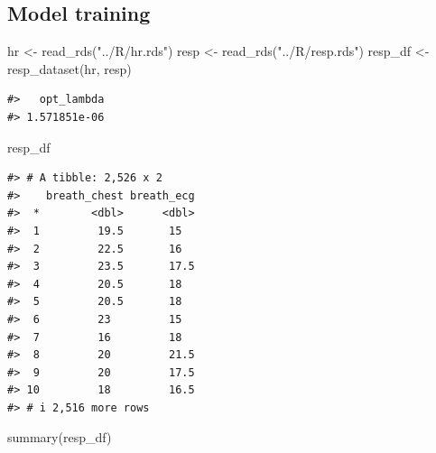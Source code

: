 \documentclass[
]{article}
\newenvironment{Shaded}{\begin{snugshade}}{\end{snugshade}}
\newcommand{\FunctionTok}[1]{\textcolor[rgb]{0.00,0.00,0.00}{#1}}
\newcommand{\NormalTok}[1]{#1}
\newcommand{\OtherTok}[1]{\textcolor[rgb]{0.56,0.35,0.01}{#1}}
\newcommand{\SpecialCharTok}[1]{\textcolor[rgb]{0.00,0.00,0.00}{#1}}
\newcommand{\StringTok}[1]{\textcolor[rgb]{0.31,0.60,0.02}{#1}}
\begin{document}
\hypertarget{model-training-1}{%
\subsection{Model training}\label{model-training-1}}

\begin{Shaded}
\begin{Highlighting}[]
\NormalTok{hr }\OtherTok{\textless{}{-}} \FunctionTok{read\_rds}\NormalTok{(}\StringTok{"../R/hr.rds"}\NormalTok{)}
\NormalTok{resp }\OtherTok{\textless{}{-}} \FunctionTok{read\_rds}\NormalTok{(}\StringTok{"../R/resp.rds"}\NormalTok{)}
\NormalTok{resp\_df }\OtherTok{\textless{}{-}} \FunctionTok{resp\_dataset}\NormalTok{(hr, resp)}
\end{Highlighting}
\end{Shaded}

\begin{Shaded}
\end{Shaded}

\begin{verbatim}
#>   opt_lambda 
#> 1.571851e-06
\end{verbatim}

\begin{Shaded}
\begin{Highlighting}[]
\NormalTok{resp\_df}
\end{Highlighting}
\end{Shaded}

\begin{verbatim}
#> # A tibble: 2,526 x 2
#>    breath_chest breath_ecg
#>  *        <dbl>      <dbl>
#>  1         19.5       15  
#>  2         22.5       16  
#>  3         23.5       17.5
#>  4         20.5       18  
#>  5         20.5       18  
#>  6         23         15  
#>  7         16         18  
#>  8         20         21.5
#>  9         20         17.5
#> 10         18         16.5
#> # i 2,516 more rows
\end{verbatim}

\begin{Shaded}
\begin{Highlighting}[]
\FunctionTok{summary}\NormalTok{(resp\_df)}
\end{Highlighting}
\end{Shaded}
\end{document}
